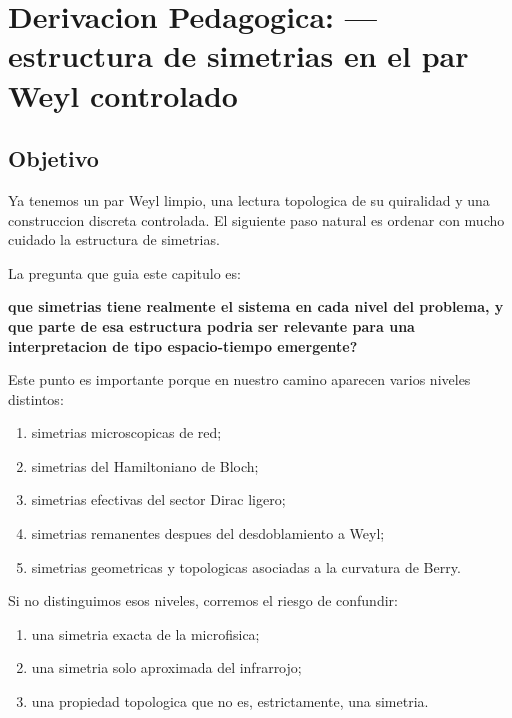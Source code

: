 \chapter{Derivacion Pedagogica: --- estructura de simetrias en el par Weyl controlado}
\label{ch:simetrias-par-weyl}







\section{Objetivo}
Ya tenemos un par Weyl limpio, una lectura topologica de su quiralidad y una construccion discreta controlada. El siguiente paso natural es ordenar con mucho cuidado la estructura de simetrias.

La pregunta que guia este capitulo es:
\begin{displayquote}
\textbf{que simetrias tiene realmente el sistema en cada nivel del problema, y que parte de esa estructura podria ser relevante para una interpretacion de tipo espacio-tiempo emergente?}
\end{displayquote}

Este punto es importante porque en nuestro camino aparecen varios niveles distintos:
\begin{enumerate}[label=\arabic*.]
    \item simetrias microscopicas de red;
    \item simetrias del Hamiltoniano de Bloch;
    \item simetrias efectivas del sector Dirac ligero;
    \item simetrias remanentes despues del desdoblamiento a Weyl;
    \item simetrias geometricas y topologicas asociadas a la curvatura de Berry.
\end{enumerate}

Si no distinguimos esos niveles, corremos el riesgo de confundir:
\begin{enumerate}[label=\arabic*.]
    \item una simetria exacta de la microfisica;
    \item una simetria solo aproximada del infrarrojo;
    \item una propiedad topologica que no es, estrictamente, una simetria.
\end{enumerate}

